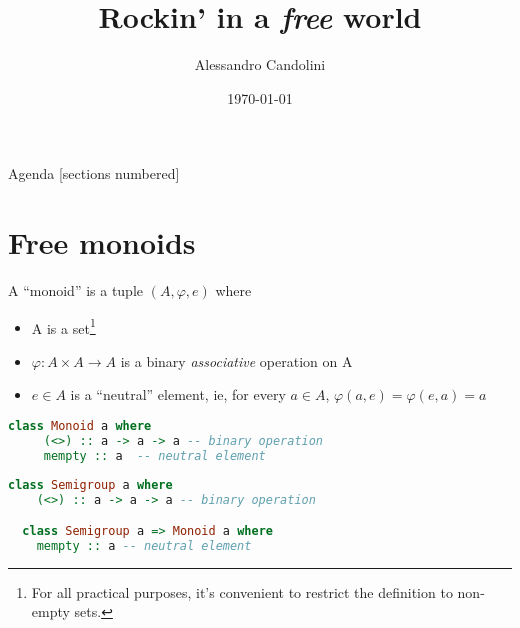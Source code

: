 \documentclass[10pt]{beamer}
\title{Rockin' in a \emph{free} world}
\date{\today}
\author[Alessandro Candolini]{Alessandro Candolini}
\begin{document}
\maketitle

\begin{frame}{Agenda}
  [sections numbered]
  \tableofcontents[hideallsubsections]
\end{frame}


\section{Free monoids}








\begin{frame}
  \begin{definition}

    A ``monoid'' is a tuple $(A, \varphi, e)$ where
    \begin{itemize}
      \item A is a set\footnote{For all practical purposes, it's convenient to restrict the definition to non-empty sets.}
      \item $\varphi : A \times A \rightarrow A$ is a binary \emph{associative} operation on A
      \item $e \in A$ is a ``neutral'' element, ie, for every $a \in A $, $\varphi(a, e) = \varphi(e,a) = a$
    \end{itemize}

  \end{definition}

\end{frame}

\begin{frame}[fragile]
  \begin{lstlisting}[language=haskell]
  class Monoid a where
     (<>) :: a -> a -> a -- binary operation
     mempty :: a  -- neutral element
  \end{lstlisting}
\end{frame}


\begin{frame}[fragile]
\begin{lstlisting}[language=haskell]
  class Semigroup a where
    (<>) :: a -> a -> a -- binary operation

  class Semigroup a => Monoid a where
    mempty :: a -- neutral element
\end{lstlisting}
\end{frame}
\end{document}
